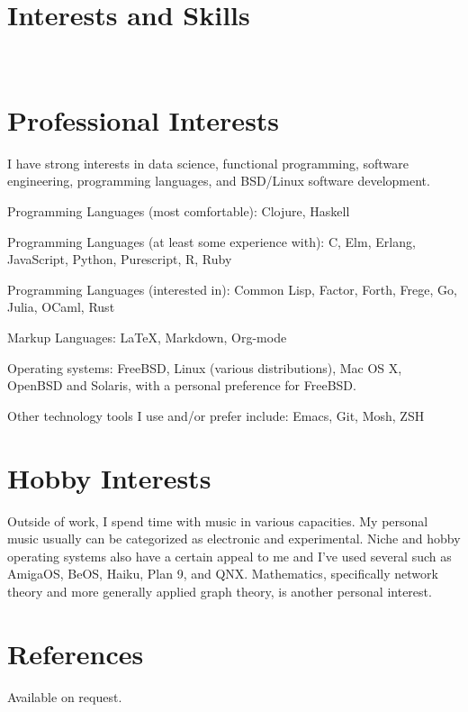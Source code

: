 \documentclass[margintitle,line]{res}
\renewcommand{\subsection}[1]{\section{\normalfont #1}}
\begin{document}
\begin{resume}

\section{Interests and Skills}
\ \\
\subsection{Professional Interests}

I have strong interests in data science, functional programming,
software engineering, programming languages, and BSD/Linux software development.

Programming Languages (most comfortable): Clojure, Haskell

Programming Languages (at least some experience with): C, Elm, Erlang, JavaScript, Python, Purescript, R, Ruby

Programming Languages (interested in): Common Lisp, Factor, Forth, Frege, Go, Julia, OCaml, Rust

Markup Languages: LaTeX, Markdown, Org-mode

Operating systems: FreeBSD, Linux (various distributions), Mac OS X, OpenBSD and Solaris,
with a personal preference for FreeBSD.

Other technology tools I use and/or prefer include: Emacs, Git, Mosh, ZSH
\subsection{Hobby Interests}

Outside of work, I spend time with music in various
capacities. My personal music usually can be categorized as electronic
and experimental. Niche and hobby operating systems also have a certain appeal
to me and I've used several such as AmigaOS, BeOS, Haiku, Plan 9, and QNX.
Mathematics, specifically network theory and more generally applied graph
theory, is another personal interest.

\section{References}

Available on request.

\end{resume}
\end{document}
